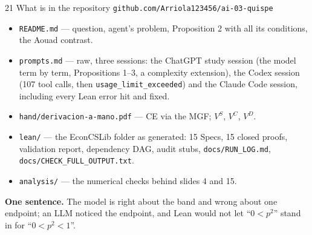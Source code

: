 \documentclass[aspectratio=169,11pt]{beamer}
\begin{document}
\begin{frame}{21 \textperiodcentered{} What is in the repository}
  \texttt{github.com/Arriola123456/ai-03-quispe}
  \begin{itemize}
    \item \texttt{README.md} --- question, agent's problem, Proposition 2 with all its conditions, the Aouad contrast.
    \item \texttt{prompts.md} --- raw, three sessions: the ChatGPT study session (the model term by term,
      Propositions 1--3, a complexity extension), the Codex session (107 tool calls, then
      \texttt{usage\_limit\_exceeded}) and the Claude Code session, including every Lean error hit and fixed.
    \item \texttt{hand/derivacion-a-mano.pdf} --- CE via the MGF; $V^S$, $V^C$, $V^D$.
    \item \texttt{lean/} --- the EconCSLib folder as generated: 15 Specs, 15 closed proofs, validation report,
      dependency DAG, audit stubs, \texttt{docs/RUN\_LOG.md}, \texttt{docs/CHECK\_FULL\_OUTPUT.txt}.
    \item \texttt{analysis/} --- the numerical checks behind slides 4 and 15.
  \end{itemize}
  \medskip
  \textbf{One sentence.} The model is right about the band and wrong about one endpoint;
  an LLM noticed the endpoint, and Lean would not let ``$0<p^2$'' stand in for ``$0<p^2<1$''.
\end{frame}
\end{document}
